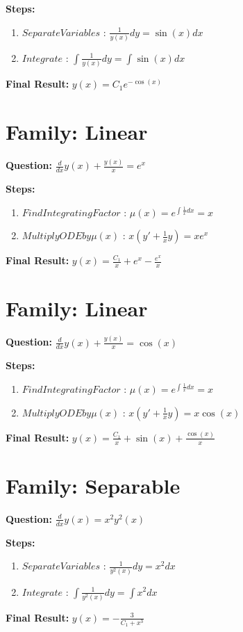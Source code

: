 \documentclass{article}
\begin{document}
\textbf{Steps:}
\begin{enumerate}
\item $Separate Variables$ :  $\frac{1}{y{\left(x \right)}} dy = \sin{\left(x \right)} dx$
\item $Integrate$ :  $\int \frac{1}{y{\left(x \right)}} dy = \int \sin{\left(x \right)} dx$
\end{enumerate}
\textbf{Final Result:} $y{\left(x \right)} = C_{1} e^{- \cos{\left(x \right)}}$

\section*{Family: Linear}
\textbf{Question:} $\frac{d}{d x} y{\left(x \right)} + \frac{y{\left(x \right)}}{x} = e^{x}$

\textbf{Steps:}
\begin{enumerate}
\item $Find Integrating Factor$ :  $\mu(x) = e^{\int \frac{1}{x} dx} = x$
\item $Multiply ODE by \mu(x)$ :  $x(y' + \frac{1}{x}y) = x e^{x}$
\end{enumerate}
\textbf{Final Result:} $y{\left(x \right)} = \frac{C_{1}}{x} + e^{x} - \frac{e^{x}}{x}$

\section*{Family: Linear}
\textbf{Question:} $\frac{d}{d x} y{\left(x \right)} + \frac{y{\left(x \right)}}{x} = \cos{\left(x \right)}$

\textbf{Steps:}
\begin{enumerate}
\item $Find Integrating Factor$ :  $\mu(x) = e^{\int \frac{1}{x} dx} = x$
\item $Multiply ODE by \mu(x)$ :  $x(y' + \frac{1}{x}y) = x \cos{\left(x \right)}$
\end{enumerate}
\textbf{Final Result:} $y{\left(x \right)} = \frac{C_{1}}{x} + \sin{\left(x \right)} + \frac{\cos{\left(x \right)}}{x}$

\section*{Family: Separable}
\textbf{Question:} $\frac{d}{d x} y{\left(x \right)} = x^{2} y^{2}{\left(x \right)}$

\textbf{Steps:}
\begin{enumerate}
\item $Separate Variables$ :  $\frac{1}{y^{2}{\left(x \right)}} dy = x^{2} dx$
\item $Integrate$ :  $\int \frac{1}{y^{2}{\left(x \right)}} dy = \int x^{2} dx$
\end{enumerate}
\textbf{Final Result:} $y{\left(x \right)} = - \frac{3}{C_{1} + x^{3}}$
\end{document}
